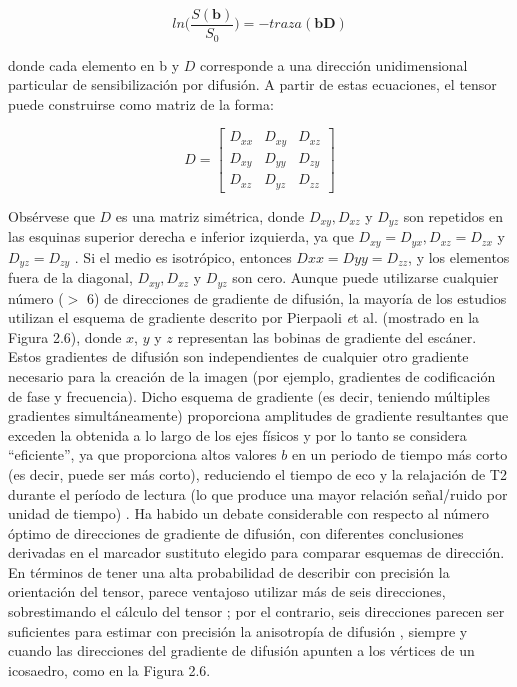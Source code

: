 \begin{equation}
ln \bigg(\frac{S(\textbf{b})}{S_0}\bigg) = -traza(\textbf{bD})
\end{equation}

donde cada elemento en b y $D$ corresponde a una dirección unidimensional particular de sensibilización por difusión. A partir de estas ecuaciones, el tensor puede construirse como matriz de la forma:

\begin{equation}
D
=
\begin{bmatrix}
    D_{xx} & D_{xy} & D_{xz} \\
    D_{xy} & D_{yy} & D_{zy} \\
    D_{xz} & D_{yz} & D_{zz}
\end{bmatrix}
\end{equation}

Obsérvese que $D$ es una matriz simétrica, donde $D_{xy}, D_{xz}$ y $D_{yz}$ son repetidos en las esquinas superior derecha e inferior izquierda, ya que $D_{xy} = D_{yx}, D_{xz} = D_{zx}$ y $D_{yz} = D_{zy}$ . Si el medio es isotrópico, entonces $D{xx} = D{yy} = D_{zz}$, y los elementos fuera de la diagonal, $D_{xy}, D_{xz}$ y $D_{yz}$ son cero. Aunque puede utilizarse cualquier número ($>$ 6) de direcciones de gradiente de difusión, la mayoría de los estudios utilizan el esquema de gradiente descrito por Pierpaoli {\emph et al}. \cite{Pierpaoli_1996} (mostrado en la Figura 2.6), donde $x$, $y$ y $z$ representan las bobinas de gradiente del escáner. Estos gradientes de difusión son independientes de cualquier otro gradiente necesario para la creación de la imagen (por ejemplo, gradientes de codificación de fase y frecuencia). Dicho esquema de gradiente (es decir, teniendo múltiples gradientes simultáneamente) proporciona amplitudes de gradiente resultantes que exceden la obtenida a lo largo de los ejes físicos y por lo tanto se considera ``eficiente'', ya que proporciona altos valores $b$ en un periodo de tiempo más corto (es decir, puede ser más corto), reduciendo el tiempo de eco y la relajación de T2 durante el período de lectura (lo que produce una mayor relación señal/ruido por unidad de tiempo) \cite{Jones_2004}. Ha habido un debate considerable con respecto al número óptimo de direcciones de gradiente de difusión, con diferentes conclusiones derivadas en el marcador sustituto elegido para comparar esquemas de dirección. En términos de tener una alta probabilidad de describir con precisión la orientación del tensor, parece ventajoso utilizar más de seis direcciones, sobrestimando el cálculo del tensor \cite{Jones_2004}; por el contrario, seis direcciones parecen ser suficientes para estimar con precisión la anisotropía de difusión \cite{Hasan_2001}, siempre y cuando las direcciones del gradiente de difusión apunten a los vértices de un icosaedro, como en la Figura 2.6.

